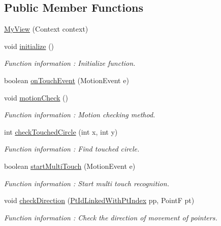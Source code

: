 \subsection*{Public Member Functions}
\begin{DoxyCompactItemize}
\item 
\hyperlink{classcom_1_1example_1_1multitouchsample_1_1_main_activity_1_1_my_view_a5df70aa609ad47a649b0b342199ef69b}{My\+View} (Context context)
\item 
void \hyperlink{classcom_1_1example_1_1multitouchsample_1_1_main_activity_1_1_my_view_a228c403eab8cc3e845623b26e23c05d8}{initialize} ()
\begin{DoxyCompactList}\small\item\em Function information \+: Initialize function. \end{DoxyCompactList}\item 
boolean \hyperlink{classcom_1_1example_1_1multitouchsample_1_1_main_activity_1_1_my_view_ab2bf7ce103f9d65b6d677274d51a887e}{on\+Touch\+Event} (Motion\+Event e)
\item 
void \hyperlink{classcom_1_1example_1_1multitouchsample_1_1_main_activity_1_1_my_view_aee59904e43e35df3dd7684f22b7dc65d}{motion\+Check} ()
\begin{DoxyCompactList}\small\item\em Function information \+: Motion checking method. \end{DoxyCompactList}\item 
int \hyperlink{classcom_1_1example_1_1multitouchsample_1_1_main_activity_1_1_my_view_a98456bf5be1085790b22ea0179fa2892}{check\+Touched\+Circle} (int x, int y)
\begin{DoxyCompactList}\small\item\em Function information \+: Find touched circle. \end{DoxyCompactList}\item 
boolean \hyperlink{classcom_1_1example_1_1multitouchsample_1_1_main_activity_1_1_my_view_a98da479657a7dabe6b6dee15e39b5a98}{start\+Multi\+Touch} (Motion\+Event e)
\begin{DoxyCompactList}\small\item\em Function information \+: Start multi touch recognition. \end{DoxyCompactList}\item 
void \hyperlink{classcom_1_1example_1_1multitouchsample_1_1_main_activity_1_1_my_view_a6fbf678025aa07a8024eddeb5431b30c}{check\+Direction} (\hyperlink{classcom_1_1example_1_1multitouchsample_1_1_main_activity_1_1_my_view_1_1_pt_id_linked_with_pt_index}{Pt\+Id\+Linked\+With\+Pt\+Index} pp, Point\+F pt)
\begin{DoxyCompactList}\small\item\em Function information \+: Check the direction of movement of pointers. \end{DoxyCompactList}\end{DoxyCompactItemize}
